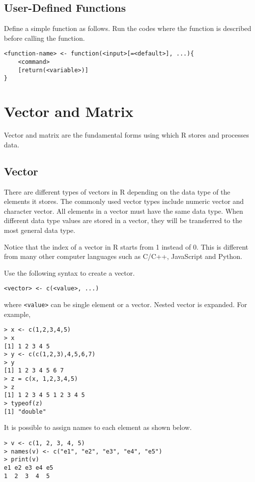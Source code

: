 \subsection{User-Defined Functions}

Define a simple function as follows. Run the codes where the function is described before calling the function.
\begin{lstlisting}
<function-name> <- function(<input>[=<default>], ...){
	<command>
	[return(<variable>)]
}
\end{lstlisting}

\section{Vector and Matrix}

Vector and matrix are the fundamental forms using which R stores and processes data.

\subsection{Vector}

There are different types of vectors in R depending on the data type of the elements it stores. The commonly used vector types include numeric vector and character vector. All elements in a vector must have the same data type. When different data type values are stored in a vector, they will be transferred to the most general data type.

Notice that the index of a vector in R starts from 1 instead of 0. This is different from many other computer languages such as C/C++, JavaScript and Python.

Use the following syntax to create a vector.
\begin{lstlisting}
<vector> <- c(<value>, ...)
\end{lstlisting}
where \verb|<value>| can be single element or a vector. Nested vector is expanded. For example,
\begin{lstlisting}
> x <- c(1,2,3,4,5)
> x
[1] 1 2 3 4 5
> y <- c(c(1,2,3),4,5,6,7)
> y
[1] 1 2 3 4 5 6 7
> z = c(x, 1,2,3,4,5)
> z
[1] 1 2 3 4 5 1 2 3 4 5
> typeof(z)
[1] "double"
\end{lstlisting}
It is possible to assign names to each element as shown below.
\begin{lstlisting}
> v <- c(1, 2, 3, 4, 5)
> names(v) <- c("e1", "e2", "e3", "e4", "e5") 	
> print(v)
e1 e2 e3 e4 e5
1  2  3  4  5
\end{lstlisting}

